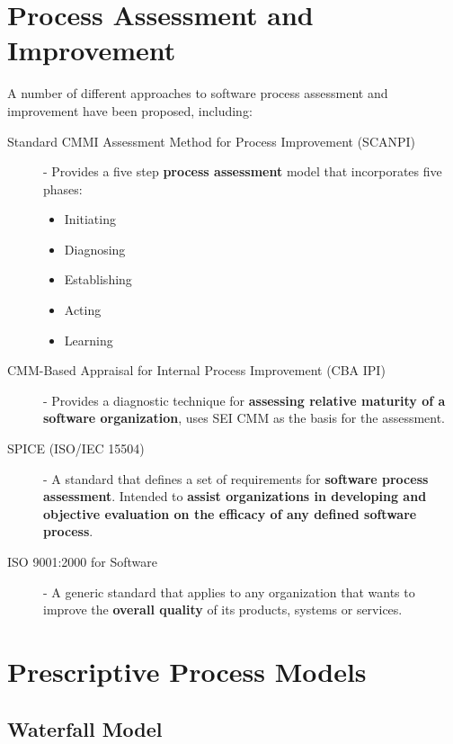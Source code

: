 \documentclass[12pt letter]{report}
\begin{document}
\section{Process Assessment and Improvement}
A number of different approaches to software process assessment and improvement have been proposed, including:
\begin{description}
  \item[Standard CMMI Assessment Method for Process Improvement (SCANPI)]  - Provides a five step \textbf{process assessment} model that incorporates five phases:
        \begin{itemize}
          \item Initiating
          \item Diagnosing
          \item Establishing
          \item Acting
          \item Learning
        \end{itemize}

  \item[CMM-Based Appraisal for Internal Process Improvement (CBA IPI)] - Provides a diagnostic technique for \textbf{assessing relative maturity of a software organization}, uses SEI CMM as the basis for the assessment.

  \item[SPICE (ISO/IEC 15504)] - A standard that defines a set of requirements for \textbf{software process assessment}. Intended to \textbf{assist organizations in developing and objective evaluation on the efficacy of any defined software process}.

  \item[ISO 9001:2000 for Software] - A generic standard that applies to any organization that wants to improve the \textbf{overall quality} of its products, systems or services.
\end{description}

\section{Prescriptive Process Models}


\subsection{Waterfall Model}
\end{document}
